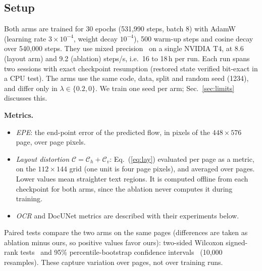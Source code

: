 \documentclass[a4paper,fleqn]{cas-sc}
\newcommand{\Cm}{\mathcal{C}}
\begin{document}
\subsection{Setup}
Both arms are trained for 30 epochs (531{,}990 steps, batch 8) with AdamW~\cite{loshchilov2019adamw} (learning rate $3\times10^{-4}$, weight decay $10^{-4}$), 500 warm-up steps and cosine decay~\cite{loshchilov2017sgdr} over 540{,}000 steps. They use mixed precision~\cite{micikevicius2018mixed} on a single NVIDIA T4, at 8.6 (layout arm) and 9.2 (ablation) steps/s, i.e.\ 16 to 18\,h per run. Each run spans two sessions with exact checkpoint resumption (restored state verified bit-exact in a CPU test). The arms use the same code, data, split and random seed (1234), and differ only in $\lambda\in\{0.2, 0\}$. We train one seed per arm; Sec.~\ref{sec:limits} discusses this.

\textbf{Metrics.}
\begin{itemize}
\item \emph{EPE}: the end-point error of the predicted flow, in pixels of the $448\times576$ page, over page pixels.
\item \emph{Layout distortion $\Cm = \Cm_h + \Cm_v$}: Eq.~(\ref{eq:lay}) evaluated per page as a metric, on the $112\times144$ grid (one unit is four page pixels), and averaged over pages. Lower values mean straighter text regions. It is computed offline from each checkpoint for both arms, since the ablation never computes it during training.
\item \emph{OCR} and DocUNet metrics are described with their experiments below.
\end{itemize}
Paired tests compare the two arms on the same pages (differences are taken as ablation minus ours, so positive values favor ours): two-sided Wilcoxon signed-rank tests~\cite{wilcoxon1945individual} and 95\% percentile-bootstrap confidence intervals~\cite{efron1993bootstrap} (10{,}000 resamples). These capture variation over pages, not over training runs.
\end{document}
